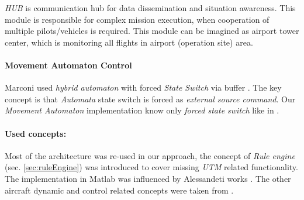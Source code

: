 \textit{HUB} is communication hub for data dissemination and situation awareness. This module is responsible for complex mission execution, when cooperation of multiple pilots/vehicles is required. This module can be imagined as airport tower center, which is monitoring all flights in airport (operation site) area.

\paragraph{Movement Automaton Control} Marconi used \emph{hybrid automaton} with forced \emph{State Switch} via buffer \cite{marconi2009control}. The key concept is that \emph{Automata} state switch is forced as \emph{external source command}. Our \emph{Movement Automaton} implementation know only \emph{forced state switch} like in \cite{frazzoli2000trajectory}. 

\paragraph{Used concepts:} Most of the architecture was re-used in our approach, the concept of \emph{Rule engine} (sec. \ref{sec:ruleEngine}) was introduced to cover missing \emph{UTM} related functionality. The implementation in Matlab was influenced by Alessandeti works \cite{allesandeti2016virtualArena,alessandrettinotes}. The other aircraft dynamic and control related concepts were taken from  \cite{stevens2015aircraft}.

